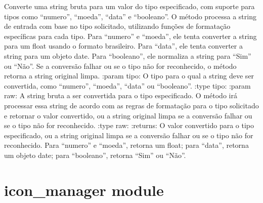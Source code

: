 \documentclass[letterpaper,10pt,english]{sphinxmanual}
\begin{document}
\begin{fulllineitems}
\label{\detokenize{api/formatters:formatters.cast_value_by_type}}
\pysigstartsignatures
\pysiglinewithargsret
{}
{\sphinxparamcomma {}}
{}
\pysigstopsignatures
\sphinxAtStartPar
Converte uma string bruta para um valor do tipo especificado, com suporte para tipos como “numero”, “moeda”, “data” e “booleano”. O método processa a string de entrada com base no tipo solicitado, utilizando funções de formatação específicas para cada tipo. Para “numero” e “moeda”, ele tenta converter a string para um float usando o formato brasileiro. Para “data”, ele tenta converter a string para um objeto date. Para “booleano”, ele normaliza a string para “Sim” ou “Não”. Se a conversão falhar ou se o tipo não for reconhecido, o método retorna a string original limpa.
:param tipo: O tipo para o qual a string deve ser convertida, como “numero”, “moeda”, “data” ou “booleano”.
:type tipo: 
:param raw: A string bruta a ser convertida para o tipo especificado. O método irá processar essa string de acordo com as regras de formatação para o tipo solicitado e retornar o valor convertido, ou a string original limpa se a conversão falhar ou se o tipo não for reconhecido.
:type raw: 
:returns: O valor convertido para o tipo especificado, ou a string original limpa se a conversão falhar ou se o tipo não for reconhecido. Para “numero” e “moeda”, retorna um float; para “data”, retorna um objeto date; para “booleano”, retorna “Sim” ou “Não”.
\begin{quote}\begin{description}
\sphinxAtStartPar
{}

\end{description}\end{quote}

\end{fulllineitems}


\sphinxstepscope


\section{icon\_manager module}
\label{\detokenize{api/icon_manager:module-icon_manager}}\label{\detokenize{api/icon_manager:icon-manager-module}}\label{\detokenize{api/icon_manager::doc}}
\end{document}
